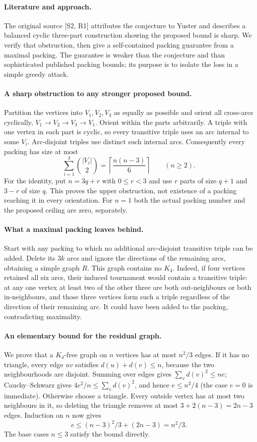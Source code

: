 \documentclass[11pt,a4paper]{article}
\begin{document}
\paragraph{Literature and approach.}
The original source [S2, R1] attributes the conjecture to Yuster and
describes a balanced cyclic three-part construction showing the proposed
bound is sharp. We verify that obstruction, then give a self-contained
packing guarantee from a maximal packing. The guarantee is weaker than
the conjecture and than sophisticated published packing bounds; its
purpose is to isolate the loss in a simple greedy attack.

\paragraph{A sharp obstruction to any stronger proposed bound.}
Partition the vertices into $V_1,V_2,V_3$ as equally as possible and
orient all cross-arcs cyclically, $V_1\to V_2\to V_3\to V_1$.
Orient within the parts arbitrarily. A triple with one vertex in
each part is cyclic, so every transitive triple uses an arc internal
to some $V_i$. Arc-disjoint triples use distinct such internal arcs.
Consequently every packing has size at most
\[
 \sum_{i=1}^3\binom{|V_i|}{2}
 =\left\lceil\frac{n(n-3)}6\right\rceil
 \qquad(n\ge2).
\]
For the identity, put $n=3q+r$ with $0\le r<3$ and use $r$ parts
of size $q+1$ and $3-r$ of size $q$. This proves the upper obstruction,
not existence of a packing reaching it in every orientation.
For $n=1$ both the actual packing number and the proposed ceiling
are zero, separately.

\paragraph{What a maximal packing leaves behind.}
Start with any packing to which no additional arc-disjoint transitive
triple can be added. Delete its $3k$ arcs and ignore the directions
of the remaining arcs, obtaining a simple graph $R$. This graph
contains no $K_4$. Indeed, if four vertices retained all six arcs,
their induced tournament would contain a transitive triple: at any
one vertex at least two of the other three are both out-neighbours
or both in-neighbours, and those three vertices form such a triple
regardless of the direction of their remaining arc. It could have
been added to the packing, contradicting maximality.

\paragraph{An elementary bound for the residual graph.}
We prove that a $K_4$-free graph on $n$ vertices has at most $n^2/3$
edges. If it has no triangle, every edge $uv$ satisfies
$d(u)+d(v)\le n$, because the two neighbourhoods are disjoint.
Summing over edges gives $\sum_vd(v)^2\le ne$; Cauchy--Schwarz
gives $4e^2/n\le\sum_vd(v)^2$, and hence $e\le n^2/4$
(the case $e=0$ is immediate). Otherwise choose a triangle. Every
outside vertex has at most two neighbours in it, so deleting the
triangle removes at most $3+2(n-3)=2n-3$ edges. Induction on $n$
now gives
\[
 e\le(n-3)^2/3+(2n-3)=n^2/3.
\]
The base cases $n\le3$ satisfy the bound directly.
\end{document}
